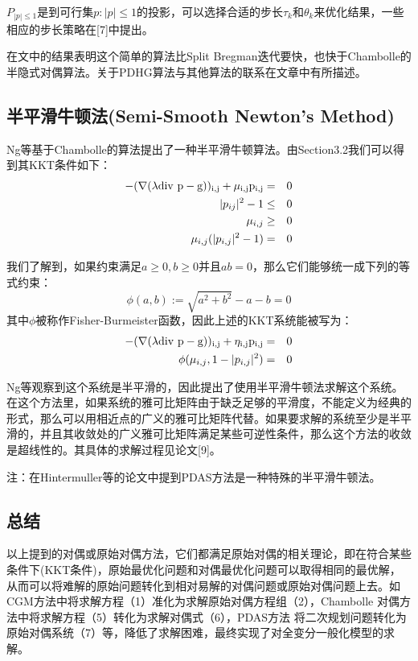 \documentclass[a4paper,12pt]{article}
\begin{document}
$P_{|p|\leq 1}$是到可行集${p:|p|\leq 1}$的投影，可以选择合适的步长$\tau_k$和$\theta_k$来优化结果，一些相应的步长策略在[7]中提出。

在文中的结果表明这个简单的算法比Split Bregman迭代要快，也快于Chambolle的半隐式对偶算法。关于PDHG算法与其他算法的联系在文章\cite{Esser:2009pd}中有所描述。


\subsection{半平滑牛顿法(Semi-Smooth Newton's Method)}

Ng等\cite{Ng:2007ss}基于Chambolle的算法提出了一种半平滑牛顿算法。由Section3.2我们可以得到其KKT条件如下：
\begin{eqnarray*}
-(\nabla(\lambda \rm div \ p-g))_{i,j}+\mu_{i,j}p_{i,j}&=&0\\
|p_{ij}|^2-1&\leq& 0\\
\mu_{i,j}&\geq& 0\\
\mu_{i,j}(|p_{i,j}|^2-1)&=&0
\end{eqnarray*}

我们了解到，如果约束满足$a\geq0,b\geq0$并且$ab=0$，那么它们能够统一成下列的等式约束：
\begin{displaymath}
\phi(a,b):=\sqrt{a^2+b^2}-a-b=0
\end{displaymath}
其中$\phi$被称作Fisher-Burmeister函数，因此上述的KKT系统能被写为：
\begin{eqnarray*}
-(\nabla(\lambda \rm div \ p-g))_{i,j}+\eta_{i,j}p_{i,j}&=&0\\
\phi(\mu_{i,j},1-|p_{i,j}|^2)&=&0
\end{eqnarray*}

Ng等观察到这个系统是半平滑的，因此提出了使用半平滑牛顿法求解这个系统。
在这个方法里，如果系统的雅可比矩阵由于缺乏足够的平滑度，不能定义为经典的形式，那么可以用相近点的广义的雅可比矩阵代替。如果要求解的系统至少是半平滑的，并且其收敛处的广义雅可比矩阵满足某些可逆性条件，那么这个方法的收敛是超线性的。其具体的求解过程见论文[9]。

注：在Hintermuller等\cite{Hintermuller:2003pd}的论文中提到PDAS方法是一种特殊的半平滑牛顿法。

\subsection{总结}

以上提到的对偶或原始对偶方法，它们都满足原始对偶的相关理论，即在符合某些条件下(KKT条件)，原始最优化问题和对偶最优化问题可以取得相同的最优解，从而可以将难解的原始问题转化到相对易解的对偶问题或原始对偶问题上去。如CGM方法中将求解方程（1）准化为求解原始对偶方程组（2），Chambolle 对偶方法中将求解方程（5）转化为求解对偶式（6），PDAS方法
将二次规划问题转化为原始对偶系统（7）等，降低了求解困难，最终实现了对全变分一般化模型的求解。
\end{document}
